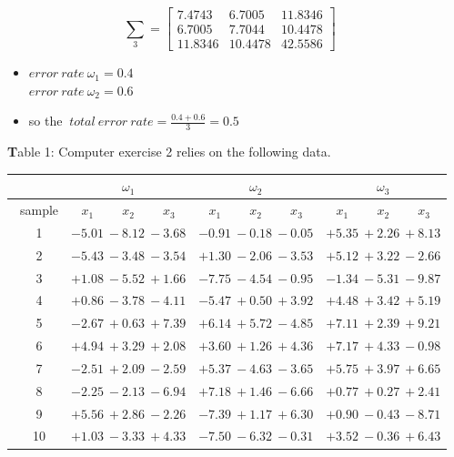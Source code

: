 \documentclass[14pt]{report}
\begin{document}
\begin{enumerate}
		\[
		\sum_3=\left[
		\begin{array}{clr}7.4743 & 6.7005 & 11.8346 \\ 6.7005 & 7.7044 & 10.4478 \\ 11.8346 & 10.4478 & 42.5586\end{array} \right]\quad
		\]
		\begin{itemize}\color{red}
		\item[]$error\ rate\ \omega_1 = 0.4$ \\ $error\ rate\ \omega_2= 0.6$
		\item[] so the $\ total\ error\ rate=\frac{0.4+0.6}{3}=0.5$ \\
		\end{itemize}
		\newpage
		\begin{center}
			\textbf Table 1: Computer exercise 2 relies on the following data.
		\end{center} 
		\begin{tabular}[t]{|c|c|c|c|}
			\hline
			\ & $\omega_1$ & $\omega_2$ & $\omega_3$ \\
			\hline
			\ sample & $x_1\qquad\  x_2\qquad\  x_3$ & $x_1\qquad\  x_2\qquad\  x_3$ & $x_1\qquad\  x_2\qquad\  x_3$ \\
			\ 1 & $-5.01\ -8.12\ -3.68$ & $-0.91\ -0.18\ -0.05$ & $+5.35\ +2.26\ +8.13$ \\
			\ 2 & $-5.43\ -3.48\ -3.54$ & $+1.30\ -2.06\ -3.53$ & $+5.12\ +3.22\ -2.66$ \\
			\ 3 & $+1.08\ -5.52\ +1.66$ & $-7.75\ -4.54\ -0.95$ & $-1.34\ -5.31\ -9.87$ \\
			\ 4 & $+0.86\ -3.78\ -4.11$ & $-5.47\ +0.50\ +3.92$ & $+4.48\ +3.42\ +5.19$ \\
			\ 5 & $-2.67\ +0.63\ +7.39$ & $+6.14\ +5.72\ -4.85$ & $+7.11\ +2.39\ +9.21$ \\
			\ 6 & $+4.94\ +3.29\ +2.08$ & $+3.60\ +1.26\ +4.36$ & $+7.17\ +4.33\ -0.98$ \\
			\ 7 & $-2.51\ +2.09\ -2.59$ & $+5.37\ -4.63\ -3.65$ & $+5.75\ +3.97\ +6.65$ \\
			\ 8 & $-2.25\ -2.13\ -6.94$ & $+7.18\ +1.46\ -6.66$ & $+0.77\ +0.27\ +2.41$ \\
			\ 9 & $+5.56\ +2.86\ -2.26$ & $-7.39\ +1.17\ +6.30$ & $+0.90\ -0.43\ -8.71$ \\
			\ 10 & $+1.03\ -3.33\ +4.33$ & $-7.50\ -6.32\ -0.31$ & $+3.52\ -0.36\ +6.43$ \\
			\hline 
		\end{tabular}
	\end{enumerate}
\end{document}
